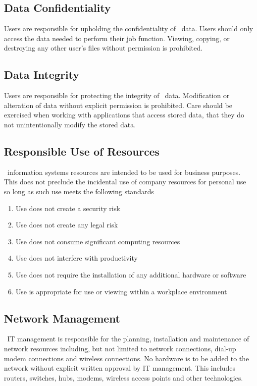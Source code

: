 \documentclass[use]{policy}
\begin{document}
		\subsection{Data Confidentiality}
			Users are responsible for upholding the confidentiality of \theOrganization\  data.  Users should only access the data needed to perform their job function. Viewing, copying, or destroying any other user’s files without permission is prohibited.
	
		\subsection{Data Integrity}
			Users are responsible for protecting the integrity of \theOrganization\  data.  Modification or alteration of data without explicit permission is prohibited.  Care should be exercised when working with applications that access stored data, that they do not unintentionally modify the stored data.
	
		\subsection{Responsible Use of Resources}
			\theOrganization\  information systems resources are intended to be used for business purposes. This does not preclude the incidental use of company resources for personal use so long as such use meets the following standards
			
			\begin{enumerate}[label=\alph*)]
				\item Use does not create a security risk
				\item Use does not create any legal risk
				\item Use does not consume significant computing resources
				\item Use does not interfere with productivity
				\item Use does not require the installation of any additional hardware or software
				\item Use is appropriate for use or viewing within a workplace environment
			\end{enumerate}
		
		\subsection{Network Management}
			\theOrganization\  IT management is responsible for the planning, installation and maintenance of network resources including, but not limited to network connections, dial-up modem connections and wireless connections.  No hardware is to be added to the network without explicit written approval by IT management.  This includes routers, switches, hubs, modems, wireless access points and other technologies.  
	
\end{document}

